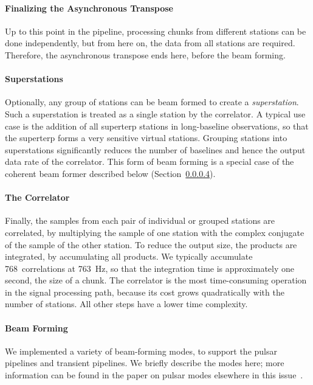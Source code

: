 \paragraph{Finalizing the Asynchronous Transpose }
Up to this point in the pipeline, processing chunks from different stations
can be done independently, but from here on, the data from all stations are
required.
Therefore, the asynchronous transpose ends here, before the beam forming.


\paragraph{Superstations }
Optionally, any group of stations can be beam formed to create a
\emph{superstation}.
Such a superstation is treated as a single station by the correlator.
A typical use case is the addition of all superterp stations in long-baseline
observations, so that the superterp forms a very sensitive virtual stations.
Grouping stations into superstations significantly reduces the number of
baselines and hence the output data rate of the correlator.
This form of beam forming is a special case of the coherent beam former
described below (Section~\ref{sec:beam-forming}).


\paragraph{The Correlator }
Finally, the samples from each pair of individual or grouped stations are
correlated, by multiplying the sample of one station with the complex conjugate
of the sample of the other station.
To reduce the output size, the products are integrated, by accumulating all
products.
We typically accumulate 768~correlations at 763~Hz, so that the integration
time is approximately one second, the size of a chunk.
The correlator is the most time-consuming operation in the signal
processing path, because its cost grows quadratically with the number of
stations.
All other steps have a lower time complexity.


\paragraph{Beam Forming}
\label{sec:beam-forming}
We implemented a variety of beam-forming modes, to support the pulsar pipelines
and transient pipelines.
We briefly describe the modes here; more information can be found in the
paper on pulsar modes elsewhere in this issue~\cite{Hessels:10}.

